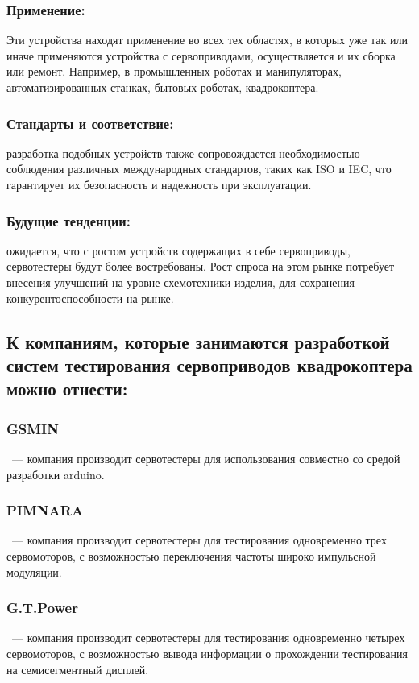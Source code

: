\documentclass[a4paper]{bsuir-tor}
\begin{document}
  \subsubsection{Применение: }
  Эти устройства находят применение во всех тех областях, в которых уже
  так или иначе применяются устройства с сервоприводами, осуществляется и
  их сборка или ремонт. Например, в промышленных роботах и манипуляторах,
  автоматизированных станках, бытовых роботах, квадрокоптера.
  \subsubsection{Стандарты и соответствие: }
  разработка подобных устройств также
  сопровождается необходимостью соблюдения различных международных
  стандартов, таких как ISO и IEC, что гарантирует их безопасность и
  надежность при эксплуатации.
  \subsubsection{Будущие тенденции: }
  ожидается, что с ростом устройств содержащих в себе сервоприводы,
  сервотестеры будут более востребованы. Рост спроса на этом рынке
  потребует внесения улучшений на уровне схемотехники изделия, для
  сохранения конкурентоспособности на рынке.
  \subsection{К компаниям,
  которые занимаются разработкой систем тестирования сервоприводов
  квадрокоптера можно отнести: }
  \subsubsection*{GSMIN} \  — компания производит сервотестеры для
  использования совместно со средой разработки arduino.
  \subsubsection*{PIMNARA} \   — компания производит сервотестеры для
  тестирования одновременно трех сервомоторов, с возможностью
  переключения частоты широко импульсной модуляции.
  \subsubsection*{G.T.Power} \  — компания производит сервотестеры для
  тестирования одновременно четырех сервомоторов, с возможностью
  вывода информации о прохождении тестирования на семисегментный дисплей.
\end{document}
